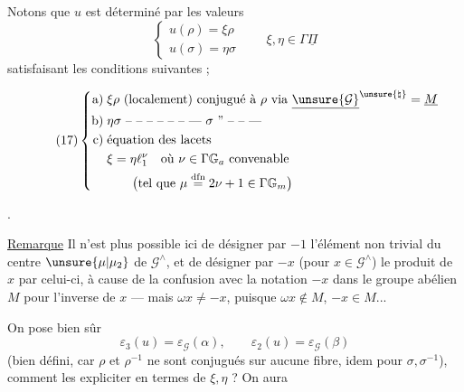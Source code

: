 
Notons que $u$ est déterminé par les valeurs
\[
\tag{16}
\begin{cases}
u(\rho)=\xi\rho\\
u(\sigma)=\eta\sigma
\end{cases}
\qquad\xi,\eta\in\Gamma\underline\Pi
\]
\inserted{$\xi,\eta$} satisfaisant les conditions suivantes ;

\[
\tag{17}
\left\{
\begin{aligned}
\text{a)}\;&\xi\rho\ \text{(localement) conjugué à }\rho\ \text{via }\underline{\unsure{\mathcal G}}^{\unsure{\natural}}=\underline M\\
\text{b)}\;&\eta\sigma\ \text{-- -- -- -- -- -- ---}\ \sigma\ \text{'' -- -- ---}\\
\text{c)}\;&\text{équation des lacets}\\
&\xi=\eta\ell_1^{\nu}\quad\text{où }\nu\in\Gamma\mathbb G_a\ \text{convenable}\\
&\qquad\bigl(\text{tel que }\mu\overset{\mathrm{dfn}}=2\nu+1\in\Gamma\mathbb G_m\bigr)
\end{aligned}\right.
\]

. 

\uline{Remarque} Il n'est plus possible ici de désigner par $-1$ l'élément non trivial \inserted{$\omega$} du centre $\unsure{\mu|\mu_2}$ de $\mathcal G^{\wedge}$, et de désigner par $-x$ (pour $x\in\mathcal G^{\wedge}$) le produit de $x$ par celui-ci, à cause de la confusion avec la notation $-x$  dans le groupe abélien $M$ pour l'inverse de $x$ --- mais  $\omega x\ne-x$, puisque $\omega x\notin M$, $-x\in M$...

On pose bien sûr
\[
\tag{18}
\varepsilon_3(u)=\varepsilon_{\mathcal G}(\alpha),\qquad
\varepsilon_2(u)=\varepsilon_{\mathcal G}(\beta)
\]
(bien défini, car $\rho$ et $\rho^{-1}$ ne sont conjugués sur aucune fibre, idem pour $\sigma,\sigma^{-1}$), comment les expliciter en termes de $\xi,\eta$ ? On aura

